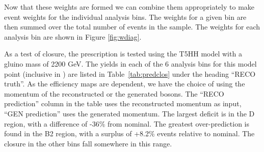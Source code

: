 Now that these weights are formed we can combine them appropriately to make event weights for the individual analysis bins. The weights for a given bin are then summed over the total number of events in the sample. The weights for each analysis bin are shown in Figure \ref{fig:wdiag}.

As a test of closure, the prescription is tested using the T5HH model with a gluino mass of 2200 GeV. The yields in each of the 6 analysis bins for this model point (inclusive in \ptmiss) are listed in Table~\ref{tab:predclos} under the heading ``RECO truth''. As the efficiency maps are \pt dependent, we have the choice of using the momentum of the reconstructed or the generated bosons. The ``RECO prediction'' column in the table uses the reconstructed momentum as input, ``GEN prediction'' uses the generated momentum. The largest deficit is in the D region, with a difference of -36\% from nominal. The greatest over-prediction is found in the B2 region, with a surplus of +8.2\% events relative to nominal. The closure in the other bins fall somewhere in this range.


